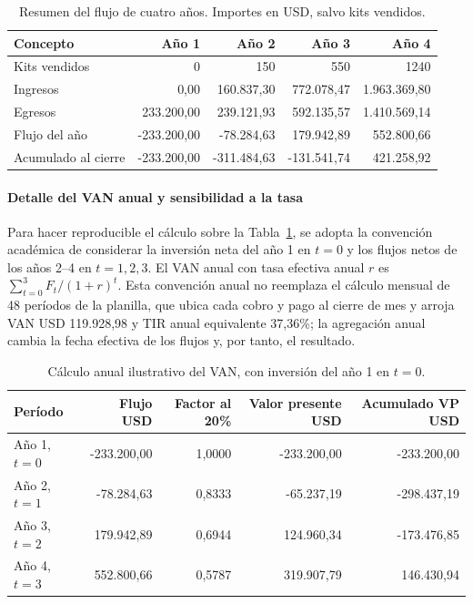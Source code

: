 \begin{table}[H]\centering\small
\caption{Resumen del flujo de cuatro años. Importes en USD, salvo kits vendidos.}\label{tab:flujo-cuatro-anios}
\begin{tabular}{lrrrr}\toprule
Concepto & Año 1 & Año 2 & Año 3 & Año 4\\\midrule
Kits vendidos & 0 & 150 & 550 & 1240\\
Ingresos & 0,00 & 160.837,30 & 772.078,47 & 1.963.369,80\\
Egresos & 233.200,00 & 239.121,93 & 592.135,57 & 1.410.569,14\\
Flujo del año & -233.200,00 & -78.284,63 & 179.942,89 & 552.800,66\\
Acumulado al cierre & -233.200,00 & -311.484,63 & -131.541,74 & 421.258,92\\
\bottomrule\end{tabular}
\end{table}

\paragraph{Detalle del VAN anual y sensibilidad a la tasa}
Para hacer reproducible el cálculo sobre la Tabla~\ref{tab:flujo-cuatro-anios}, se adopta la convención académica de considerar la inversión neta del año 1 en $t=0$ y los flujos netos de los años 2--4 en $t=1,2,3$. El VAN anual con tasa efectiva anual $r$ es $\sum_{t=0}^{3}F_t/(1+r)^t$. Esta convención anual no reemplaza el cálculo mensual de 48 períodos de la planilla, que ubica cada cobro y pago al cierre de mes y arroja VAN USD 119.928,98 y TIR anual equivalente 37,36\%; la agregación anual cambia la fecha efectiva de los flujos y, por tanto, el resultado.

\begin{table}[H]\centering\small
\caption{Cálculo anual ilustrativo del VAN, con inversión del año 1 en $t=0$.}
\begin{tabular}{lrrrr}\toprule
Período & Flujo USD & Factor al 20\% & Valor presente USD & Acumulado VP USD\\\midrule
Año 1, $t=0$ & -233.200,00 & 1,0000 & -233.200,00 & -233.200,00\\
Año 2, $t=1$ & -78.284,63 & 0,8333 & -65.237,19 & -298.437,19\\
Año 3, $t=2$ & 179.942,89 & 0,6944 & 124.960,34 & -173.476,85\\
Año 4, $t=3$ & 552.800,66 & 0,5787 & 319.907,79 & 146.430,94\\
\bottomrule\end{tabular}
\end{table}

